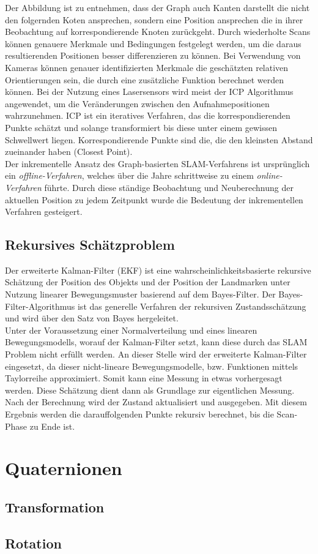 Der Abbildung ist zu entnehmen, dass der Graph auch Kanten darstellt die nicht den folgernden Koten ansprechen, sondern eine 
Position ansprechen die in ihrer Beobachtung auf korrespondierende Knoten zurückgeht. Durch wiederholte Scans können genauere Merkmale und 
Bedingungen festgelegt werden, um die daraus resultierenden Positionen besser differenzieren zu können. Bei Verwendung von Kameras können 
genauer identifizierten Merkmale die geschätzten relativen Orientierungen sein, die durch eine zusätzliche Funktion berechnet werden 
können. Bei der Nutzung eines Lasersensors wird meist der \ac{ICP} Algorithmus angewendet, um die Veränderungen zwischen den Aufnahmepositionen 
wahrzunehmen. \acs{ICP} ist ein iteratives Verfahren, das die korrespondierenden Punkte schätzt und solange transformiert bis diese unter 
einem gewissen Schwellwert liegen. Korrespondierende Punkte sind die, die den kleinsten Abstand zueinander haben (Closest Point). \cite{robotik2.2020m}
\\ 
Der inkrementelle Ansatz des Graph-basierten \acs{SLAM}-Verfahrens ist ursprünglich ein \textit{offline-Verfahren}, welches über die Jahre 
schrittweise zu einem \textit{online-Verfahren} führte. Durch diese ständige Beobachtung und Neuberechnung der aktuellen Position zu jedem 
Zeitpunkt wurde die Bedeutung der inkrementellen Verfahren gesteigert. %

\subsection*{Rekursives Schätzproblem}
Der erweiterte Kalman-Filter (\acs{EKF}) ist eine wahrscheinlichkeitsbasierte rekursive Schätzung der Position des Objekts und der Position der 
Landmarken unter Nutzung linearer Bewegungsmuster basierend auf dem Bayes-Filter. Der Bayes-Filter-Algorithmus ist das generelle Verfahren der 
rekursiven Zustandsschätzung und wird über den Satz von Bayes hergeleitet. 
\\
Unter der Voraussetzung einer Normalverteilung und eines linearen Bewegungsmodells, worauf der Kalman-Filter setzt, kann diese durch das 
\acs{SLAM} Problem nicht erfüllt werden. An dieser Stelle wird der erweiterte Kalman-Filter eingesetzt, da dieser nicht-lineare 
Bewegungsmodelle, bzw. Funktionen mittels Taylorreihe approximiert. Somit kann eine Messung in etwas vorhergesagt werden. Diese Schätzung 
dient dann als Grundlage zur eigentlichen Messung. Nach der Berechnung wird der Zustand aktualisiert und ausgegeben. Mit diesem Ergebnis 
werden die darauffolgenden Punkte rekursiv berechnet, bis die Scan-Phase zu Ende ist.

\section{Quaternionen}
\label{chap:Quaternionen}





\subsection{Transformation}
\subsection{Rotation}

